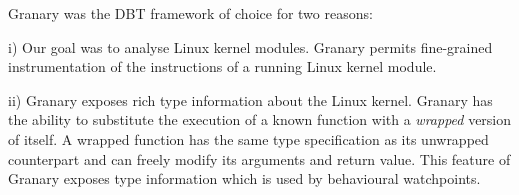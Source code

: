 \documentclass[letterpaper,twocolumn,10pt]{article}
\newenvironment{enumerate*}%
  {\begin{enumerate}%
    \setlength{\itemsep}{2pt}%
    \setlength{\parskip}{0pt}}%
  {\end{enumerate}}
\begin{document}
Granary was the DBT framework of choice for two reasons: 
\begin{enumerate*}
	\item[i)] Our goal was to analyse Linux kernel modules. Granary permits fine-grained instrumentation of the instructions of a running Linux kernel module.
	\item[ii)] Granary exposes rich type information about the Linux kernel. Granary has the ability to substitute the execution of a known function with a \emph{wrapped} version of itself. A wrapped function has the same type specification as its unwrapped counterpart and can freely modify its arguments and return value. This feature of Granary exposes type information which is used by behavioural watchpoints.
\end{enumerate*}










\end{document}
